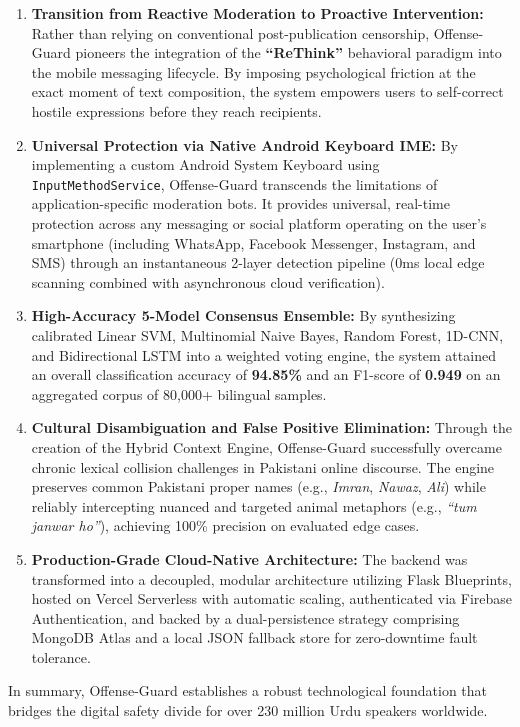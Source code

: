 \documentclass[A4paper,12pt]{report}
\theoremstyle{plain}
\theoremstyle{definition}
\theoremstyle{remark}
\numberwithin{equation}{section}
\begin{document}
\begin{enumerate}[leftmargin=*]
    \item \textbf{Transition from Reactive Moderation to Proactive Intervention:} Rather than relying on conventional post-publication censorship, Offense-Guard pioneers the integration of the \textbf{``ReThink''} behavioral paradigm into the mobile messaging lifecycle. By imposing psychological friction at the exact moment of text composition, the system empowers users to self-correct hostile expressions before they reach recipients.
    \item \textbf{Universal Protection via Native Android Keyboard IME:} By implementing a custom Android System Keyboard using \texttt{InputMethodService}, Offense-Guard transcends the limitations of application-specific moderation bots. It provides universal, real-time protection across any messaging or social platform operating on the user's smartphone (including WhatsApp, Facebook Messenger, Instagram, and SMS) through an instantaneous 2-layer detection pipeline (0ms local edge scanning combined with asynchronous cloud verification).
    \item \textbf{High-Accuracy 5-Model Consensus Ensemble:} By synthesizing calibrated Linear SVM, Multinomial Naive Bayes, Random Forest, 1D-CNN, and Bidirectional LSTM into a weighted voting engine, the system attained an overall classification accuracy of \textbf{94.85\%} and an F1-score of \textbf{0.949} on an aggregated corpus of 80,000+ bilingual samples.
    \item \textbf{Cultural Disambiguation and False Positive Elimination:} Through the creation of the Hybrid Context Engine, Offense-Guard successfully overcame chronic lexical collision challenges in Pakistani online discourse. The engine preserves common Pakistani proper names (e.g., \textit{Imran}, \textit{Nawaz}, \textit{Ali}) while reliably intercepting nuanced and targeted animal metaphors (e.g., \textit{``tum janwar ho''}), achieving 100\% precision on evaluated edge cases.
    \item \textbf{Production-Grade Cloud-Native Architecture:} The backend was transformed into a decoupled, modular architecture utilizing Flask Blueprints, hosted on Vercel Serverless with automatic scaling, authenticated via Firebase Authentication, and backed by a dual-persistence strategy comprising MongoDB Atlas and a local JSON fallback store for zero-downtime fault tolerance.
\end{enumerate}

In summary, Offense-Guard establishes a robust technological foundation that bridges the digital safety divide for over 230 million Urdu speakers worldwide.
\end{document}
